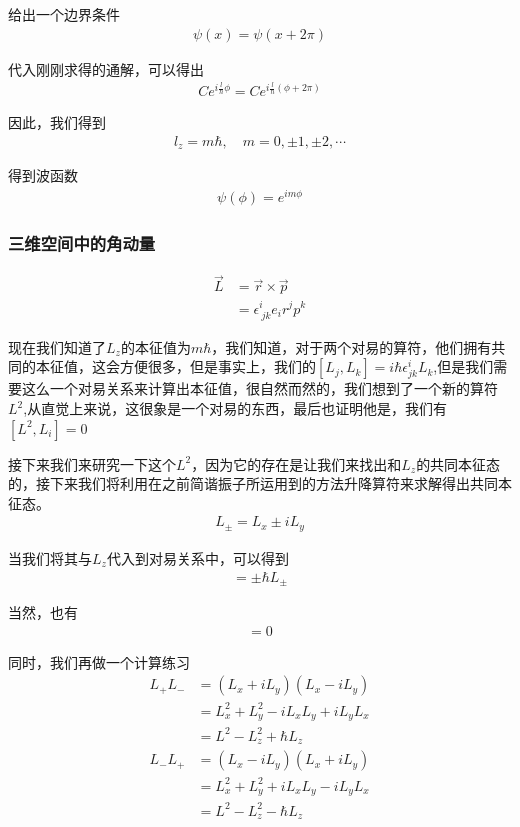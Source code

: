 \documentclass{article}
\begin{document}
给出一个边界条件
\begin{align*}
    \psi(x)=\psi(x+2\pi)
\end{align*}

代入刚刚求得的通解，可以得出
\begin{align*}
    Ce^{i\frac{l}{\hbar}\phi}=Ce^{i\frac{l}{\hbar}(\phi+2\pi)}
\end{align*}

因此，我们得到
\begin{align*}
    l_z=m\hbar,\quad m=0,\pm 1,\pm 2,\cdots
\end{align*}

得到波函数
\begin{align*}
    \psi(\phi)=e^{im\phi}
\end{align*}

\subsubsection{三维空间中的角动量}
\begin{align*}
    \vec{L}&=\vec{r}\times\vec{p}\\
    &=\epsilon^{i}_{\ jk}e_ir^jp^k
\end{align*}

现在我们知道了$L_z$的本征值为$m\hbar$，我们知道，对于两个对易的算符，他们拥有共同的本征值，这会方便很多，但是事实上，我们的$[L_j,L_k]=i\hbar\epsilon^{i}_{jk}L_k$,但是我们需要这么一个对易关系来计算出本征值，很自然而然的，我们想到了一个新的算符$L^2$,从直觉上来说，这很象是一个对易的东西，最后也证明他是，我们有$[L^2,L_i]=0$

接下来我们来研究一下这个$L^2$，因为它的存在是让我们来找出和$L_z$的共同本征态的，接下来我们将利用在之前简谐振子所运用到的方法升降算符来求解得出共同本征态。
\begin{align*}
    L_{\pm}=L_x\pm iL_y
\end{align*}

当我们将其与$L_z$代入到对易关系中，可以得到
\begin{align*}
    [L_z,L_{\pm}]=\pm\hbar L_{\pm}
\end{align*}

当然，也有
\begin{align*}
    [L^2,L_{\pm}]=0
\end{align*}

同时，我们再做一个计算练习
\begin{align*}
    L_+L_-&=(L_x+iL_y)(L_x-iL_y)\\
    &=L_x^2+L_y^2-iL_xL_y+iL_yL_x\\
    &=L^2-L_z^2+\hbar L_z\\
    L_-L_+&=(L_x-iL_y)(L_x+iL_y)\\
    &=L_x^2+L_y^2+iL_xL_y-iL_yL_x\\
    &=L^2-L_z^2-\hbar L_z
\end{align*}
\end{document}
